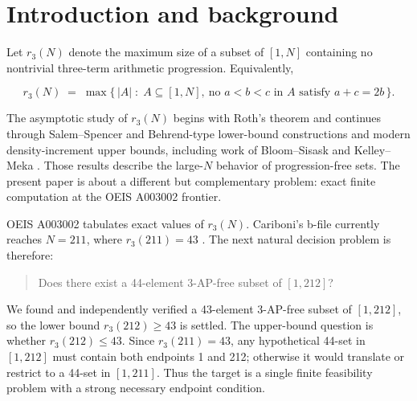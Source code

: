 \section{Introduction and background}\label{introduction-and-background}

Let $r_3(N)$ denote the maximum size of a subset of $[1, N]$ containing no
nontrivial three-term arithmetic progression. Equivalently,

\[
  r_3(N) \;=\; \max\bigl\{\, |A| \;:\; A \subseteq [1, N],\
  \text{no } a < b < c \text{ in } A \text{ satisfy } a + c = 2b \,\bigr\}.
\]

The asymptotic study of $r_3(N)$ begins with Roth's theorem \cite{roth-1953}
and continues through Salem--Spencer and Behrend-type lower-bound
constructions \cite{salem-spencer-1942,behrend-1946} and modern
density-increment upper bounds, including work of Bloom--Sisask and
Kelley--Meka \cite{bloom-sisask-2023,kelley-meka-2023}. Those results
describe the large-$N$ behavior of progression-free sets. The present paper is
about a different but complementary problem: exact finite computation at the
OEIS A003002 frontier.

OEIS A003002 tabulates exact values of $r_3(N)$. Cariboni's b-file currently
reaches $N = 211$, where $r_3(211) = 43$
\cite{oeis-a003002,cariboni-b003002}. The next natural decision problem is
therefore:

\begin{quote}
Does there exist a 44-element 3-AP-free subset of $[1, 212]$?
\end{quote}

We found and independently verified a 43-element 3-AP-free subset of
$[1, 212]$, so the lower bound $r_3(212) \geq 43$ is settled. The upper-bound
question is whether $r_3(212) \leq 43$. Since $r_3(211) = 43$, any hypothetical
44-set in $[1, 212]$ must contain both endpoints 1 and 212; otherwise it
would translate or restrict to a 44-set in $[1, 211]$. Thus the target is a
single finite feasibility problem with a strong necessary endpoint condition.

